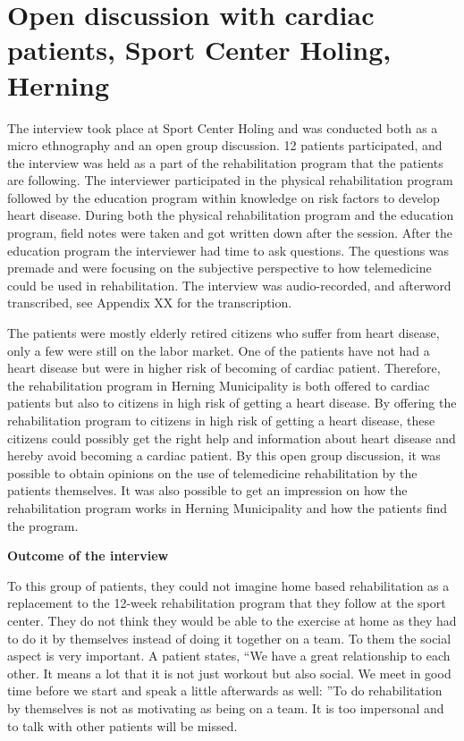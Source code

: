 \section{Open discussion with cardiac patients, Sport Center Holing, Herning}
\label{patientinterview} 

The interview took place at Sport Center Holing and was conducted both as a micro ethnography and an open group discussion. 12 patients participated, and the interview was held as a part of the rehabilitation program that the patients are following. The interviewer participated in the physical rehabilitation program followed by the education program within knowledge on risk factors to develop heart disease. During both the physical rehabilitation program and the education program, field notes were taken and got written down after the session. After the education program the interviewer had time to ask questions. The questions was premade and were focusing on the subjective perspective to how telemedicine could be used in rehabilitation. The interview was audio-recorded, and afterword transcribed, see Appendix XX for the transcription. 

The patients were mostly elderly retired citizens who suffer from heart disease, only a few were still on the labor market. One of the patients have not had a heart disease but were in higher risk of becoming of cardiac patient. Therefore, the rehabilitation program in Herning Municipality is both offered to cardiac patients but also to citizens in high risk of getting a heart disease. By offering the rehabilitation program to citizens in high risk of getting a heart disease, these citizens could possibly get the right help and information about heart disease and hereby avoid becoming a cardiac patient. By this open group discussion, it was possible to obtain opinions on the use of telemedicine rehabilitation by the patients themselves. It was also possible to get an impression on how the rehabilitation program works in Herning Municipality and how the patients find the program. 

\textbf{Outcome of the interview}

To this group of patients, they could not imagine home based rehabilitation as a replacement to the 12-week rehabilitation program that they follow at the sport center. They do not think they would be able to the exercise at home as they had to do it by themselves instead of doing it together on a team. To them the social aspect is very important. A patient states, “We have a great relationship to each other. It means a lot that it is not just workout but also social. We meet in good time before we start and speak a little afterwards as well: ”To do rehabilitation by themselves is not as motivating as being on a team. It is too impersonal and to talk with other patients will be missed. 

